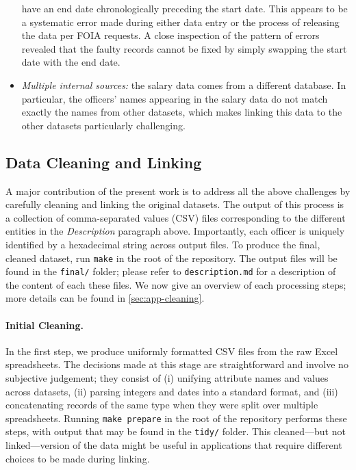 \begin{itemize}
		have an end date chronologically preceding the start date. This appears
		to be a systematic error made during either data entry or the process 
                of releasing the data per FOIA requests. A close inspection of the pattern of
		errors revealed that the faulty records cannot be fixed by simply
		swapping the start date with the end date.
	\item \emph{Multiple internal sources:} the salary data comes from
		a different database. In particular, the officers' names appearing in
		the salary data do not match exactly the names from other datasets,
		which makes linking this data to the other datasets particularly
		challenging.
\end{itemize}


\subsection{Data Cleaning and Linking}\label{sec:cleaning}

A major contribution of the present work is to address all the above challenges
by carefully cleaning and linking the original datasets. The output of this
process is a collection of comma-separated values (CSV) files corresponding to
the different entities in the \emph{Description} paragraph above.  Importantly,
each officer is uniquely identified by a hexadecimal string across output
files. To produce the final, cleaned dataset, run \texttt{make} in the root of
the repository. The output files will be found in the \texttt{final/} folder;
please refer to \texttt{description.md} for a description of the content of
each these files. We now give an overview of each processing steps; more
details can be found in \cref{sec:app-cleaning}.

\paragraph{Initial Cleaning.} In the first step, we produce uniformly formatted
CSV files from the raw Excel spreadsheets. The decisions made at this stage are
straightforward and involve no subjective judgement; they consist of (i)
unifying attribute names and values across datasets, (ii) parsing integers and
dates into a standard format, and (iii) concatenating records of the same type
when they were split over multiple spreadsheets.
Running \texttt{make prepare} in the root of the repository
performs these steps, with output that may be found in the
\texttt{tidy/} folder. This cleaned---but not linked---version of the data might be useful
in applications that require different choices to be made during linking.

